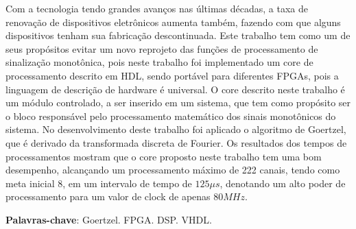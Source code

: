 \documentclass[monografia]{subfiles}
\begin{document}
	\begin{resumo}
	\noindent

	Com a tecnologia tendo grandes avanços nas últimas décadas, a taxa de renovação de dispositivos eletrônicos aumenta também, fazendo com
	que alguns dispositivos tenham sua fabricação descontinuada. Este trabalho tem como um de seus propósitos evitar um novo reprojeto das funções
	de processamento de sinalização monotônica, pois neste trabalho foi implementado um core de processamento descrito em HDL, sendo portável para
	diferentes FPGAs, pois a linguagem de descrição de hardware é universal.
	O core descrito neste trabalho é um módulo controlado, a ser inserido em um sistema, que tem como propósito ser o bloco responsável pelo processamento
	matemático dos sinais monotônicos do sistema.
	No desenvolvimento deste trabalho foi aplicado o algoritmo de Goertzel, que é derivado da
	transformada discreta de Fourier. Os resultados dos tempos de processamentos mostram que o core proposto neste trabalho tem uma bom desempenho, alcançando 
	um processamento máximo de 222 canais, tendo como meta inicial 8, em um intervalo de tempo de $125 \mu s$, 
	denotando um alto poder de processamento para um valor de clock de apenas
	$80 MHz$. 







	

	
	
	
	
	

	\vspace{\onelineskip}
	\textbf{Palavras-chave}: Goertzel. FPGA. DSP. VHDL.
	\end{resumo}
		
\end{document}
